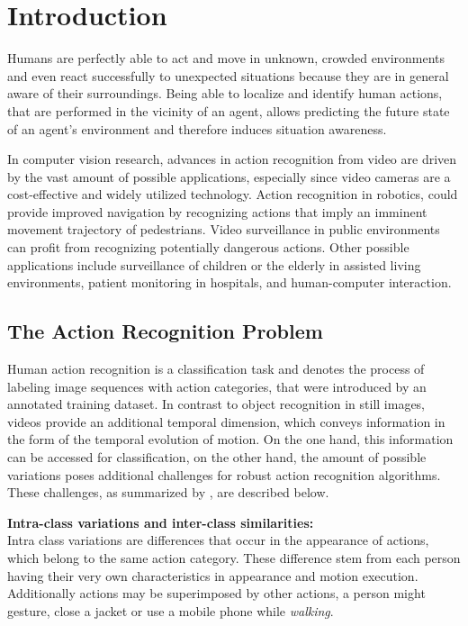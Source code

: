 \section{Introduction}


Humans are perfectly able to act and move in unknown, crowded environments and even react successfully to unexpected situations because they are in general aware of their surroundings.
Being able to localize and identify human actions, that are performed in the vicinity of an agent, allows predicting the future state of an agent's environment and therefore induces situation awareness.

In computer vision research, advances in action recognition from video are driven by the vast amount of possible applications, especially since video cameras are a cost-effective and widely utilized technology.
Action recognition in robotics, could provide improved navigation by recognizing actions that imply an imminent movement trajectory of pedestrians.
Video surveillance in public environments can profit from recognizing potentially dangerous actions.
Other possible applications include surveillance of children or the elderly in assisted living environments, patient monitoring in hospitals, and human-computer interaction.


\subsection{The Action Recognition Problem}
Human action recognition is a classification task and denotes the process of labeling image sequences with action categories, that were introduced by an annotated training dataset.
In contrast to object recognition in still images, videos provide an additional temporal dimension, which conveys information in the form of the temporal evolution of motion.
On the one hand, this information can be accessed for classification, on the other hand, the amount of possible variations poses additional challenges for robust action recognition algorithms.
These challenges, as summarized by \textcite{poppe_survey_2010}, are described below.

\textbf{Intra-class variations and inter-class similarities:} \\
Intra class variations are differences that occur in the appearance of actions, which belong to the same action category.
These difference stem from each person having their very own characteristics in appearance and motion execution.
Additionally actions may be superimposed by other actions, a person might gesture, close a jacket or use a mobile phone while \textit{walking}.

